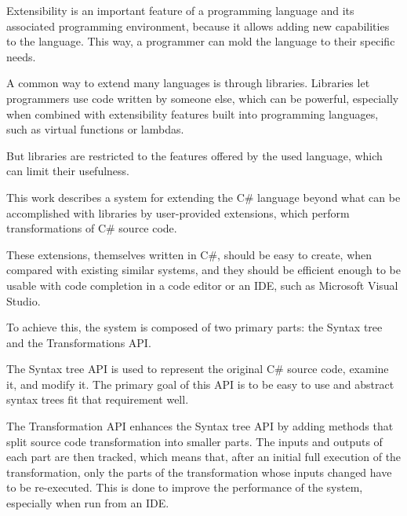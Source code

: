 
Extensibility is an important feature of a programming language and its associated programming environment, because it allows adding new capabilities to the language. This way, a programmer can mold the language to their specific needs.

A common way to extend many languages is through libraries. Libraries let programmers use code written by someone else, which can be powerful, especially when combined with extensibility features built into programming languages, such as virtual functions or lambdas.

But libraries are restricted to the features offered by the used language, which can limit their usefulness.

\medskip

This work describes a system for extending the C\# language beyond what can be accomplished with libraries by user-provided extensions, which perform transformations of C\# source code.

These extensions, themselves written in C\#, should be easy to create, when compared with existing similar systems, and they should be efficient enough to be usable with code completion in a code editor or an \ac{IDE}, such as Microsoft Visual Studio.

To achieve this, the system is composed of two primary parts: the Syntax tree  and the Transformations \acs{API}.

\medskip

The Syntax tree \acs{API} is used to represent the original C\# source code, examine it, and modify it. The primary goal of this \acs{API} is to be easy to use and abstract syntax trees fit that requirement well.

The Transformation \acs{API} enhances the Syntax tree \acs{API} by adding methods that split source code transformation into smaller parts. The inputs and outputs of each part are then tracked, which means that, after an initial full execution of the transformation, only the parts of the transformation whose inputs changed have to be re-executed. This is done to improve the performance of the system, especially when run from an \ac{IDE}.